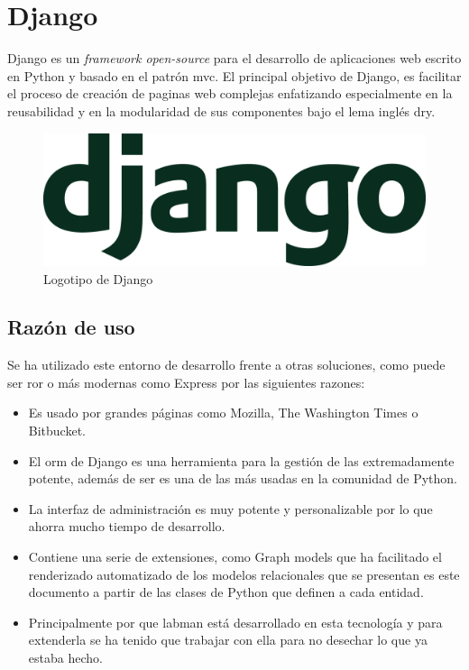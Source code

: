 \section{Django}

Django es un \textit{framework open-source} para el desarrollo de aplicaciones web escrito en Python y basado en el patrón \acrfull{mvc}. El principal objetivo de Django, es facilitar el proceso de creación de paginas web complejas enfatizando especialmente en la reusabilidad y en la modularidad de sus componentes bajo el lema inglés \acrfull{dry}.

\begin{figure}[!htbp]
	\centering
	\includegraphics[scale=0.18]{fig/django_logo}
	\caption{Logotipo de Django}
\end{figure}

\subsection{Razón de uso}

Se ha utilizado este entorno de desarrollo frente a otras soluciones, como puede ser \acrfull{ror}\cite{RoR} o más modernas como Express\cite{Express} por las siguientes razones:

\begin{itemize}
	\item Es usado por grandes páginas como Mozilla, The Washington Times\cite{TWT} o Bitbucket\cite{Bitbucket}.
	\item El \acrshort{orm} de Django es una herramienta para la gestión de las  extremadamente potente, además de ser es una de las más usadas en la comunidad de Python.
	\item La interfaz de administración es muy potente y personalizable por lo que ahorra mucho tiempo de desarrollo.
	\item Contiene una serie de extensiones, como Graph models\cite{GraphModel} que ha facilitado el renderizado automatizado de los modelos relacionales que se presentan es este documento a partir de las clases de Python que definen a cada entidad.
	\item Principalmente por que \acrshort{labman} está desarrollado en esta tecnología y para extenderla se ha tenido que trabajar con ella para no desechar lo que ya estaba hecho.
\end{itemize}

